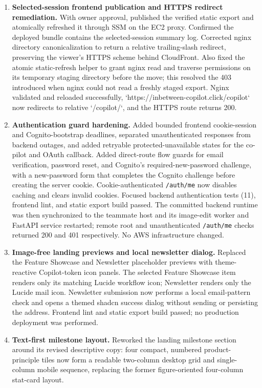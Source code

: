 \begin{enumerate}
  \item \textbf{Selected-session frontend publication and HTTPS redirect remediation.} With owner approval, published the verified static export and atomically refreshed it through SSM on the EC2 proxy. Confirmed the deployed bundle contains the selected-session summary log. Corrected nginx directory canonicalization to return a relative trailing-slash redirect, preserving the viewer's HTTPS scheme behind CloudFront. Also fixed the atomic static-refresh helper to grant nginx read and traverse permissions on its temporary staging directory before the move; this resolved the 403 introduced when nginx could not read a freshly staged export. Nginx validated and reloaded successfully, `https://inbetween-copilot.click/copilot` now redirects to relative `/copilot/`, and the HTTPS route returns 200.
  \item \textbf{Authentication guard hardening.} Added bounded frontend cookie-session and Cognito-bootstrap deadlines, separated unauthenticated responses from backend outages, and added retryable protected-unavailable states for the co-pilot and OAuth callback. Added direct-route flow guards for email verification, password reset, and Cognito's required-new-password challenge, with a new-password form that completes the Cognito challenge before creating the server cookie. Cookie-authenticated \texttt{/auth/me} now disables caching and clears invalid cookies. Focused backend authentication tests (11), frontend lint, and static export build passed. The committed backend runtime was then synchronized to the teammate host and its image-edit worker and FastAPI service restarted; remote root and unauthenticated \texttt{/auth/me} checks returned 200 and 401 respectively. No AWS infrastructure changed.
  \item \textbf{Image-free landing previews and local newsletter dialog.} Replaced the Feature Showcase and Newsletter placeholder previews with theme-reactive Copilot-token icon panels. The selected Feature Showcase item renders only its matching Lucide workflow icon; Newsletter renders only the Lucide mail icon. Newsletter submission now performs a local email-pattern check and opens a themed shadcn success dialog without sending or persisting the address. Frontend lint and static export build passed; no production deployment was performed.
  \item \textbf{Text-first milestone layout.} Reworked the landing milestone section around its revised descriptive copy: four compact, numbered product-principle tiles now form a readable two-column desktop grid and single-column mobile sequence, replacing the former figure-oriented four-column stat-card layout.

\end{enumerate}
